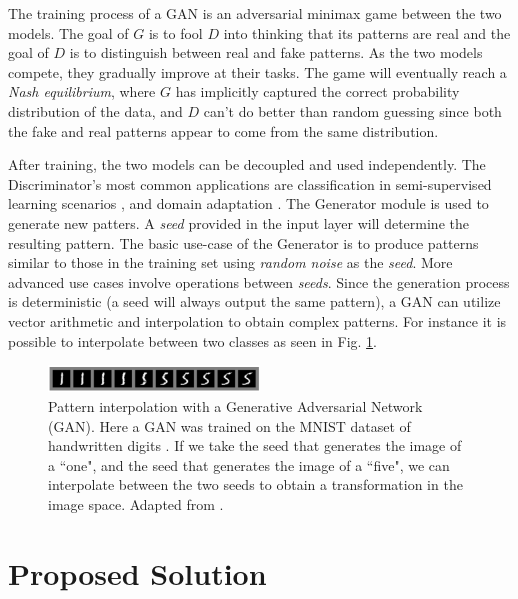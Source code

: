 \documentclass[runningheads]{llncs}
\begin{document}
The training process of a GAN is an adversarial minimax game between the two models. The goal of $G$ is to fool $D$ into thinking that its patterns are real and the goal of $D$ is to distinguish between real and fake patterns. As the two models compete, they gradually improve at their tasks. The game will eventually reach a \textit{Nash equilibrium}, where $G$ has implicitly captured the correct probability distribution of the data, and $D$ can't do better than random guessing since both the fake and real patterns appear to come from the same distribution.

After training, the two models can be decoupled and used independently. The Discriminator's most common applications are classification in semi-supervised learning scenarios \cite{salimans2016improved}, and domain adaptation \cite{bousmalis2017unsupervised}.
The Generator module is used to generate new patters. A \textit{seed} provided in the input layer will determine the resulting pattern. The basic use-case of the Generator is to produce patterns similar to those in the training set using \textit{random noise} as the \textit{seed}. More advanced use cases involve operations between \textit{seeds}. Since the generation process is deterministic (a seed will always output the same pattern), a GAN can utilize vector arithmetic and interpolation to obtain complex patterns. For instance it is possible to  interpolate between two classes as seen in Fig. \ref{fig:GANS_interp}.

\begin{figure}[h]
    \centering
    \includegraphics[width=0.5\textwidth]{introduction/img/GANS_interp2.PNG}
    \caption{Pattern interpolation with a Generative Adversarial Network (GAN). Here a GAN was trained on the MNIST dataset of handwritten digits \cite{lecun1998mnist}. If we take the seed that generates the image of a ``one", and the seed that generates the image of a ``five", we can interpolate between the two seeds to obtain a transformation in the image space. Adapted from \cite{goodfellow2014generative}.}
\label{fig:GANS_interp}
\end{figure}

\section{Proposed Solution}
\label{sec:proposedSolution}
\end{document}
